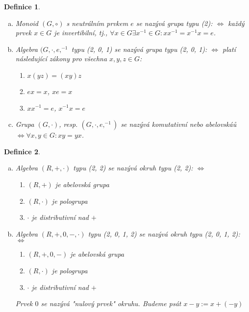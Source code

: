 \documentclass[a4paper, 11pt]{report}
\newtheorem{mydef}{Definice}[chapter]
\begin{document}
\begin{mydef}
\begin{enumerate}[a)]
	\item Monoid $(G, \circ)$ s neutrálním prvkem $e$ se nazývá \emph{grupa} typu (2): $\Leftrightarrow$ každý prvek $x \in G$ je invertibilní, tj., $\forall x \in G \exists x^{-1} \in G: x x^{-1} = x^{-1} x = e$.
	\item Algebra $(G, \cdot, e, ^{-1}$ typu (2, 0, 1) se nazývá \emph{grupa} typu (2, 0, 1): $\Leftrightarrow$ platí následující zákony pro všechna $x, y, z \in G$:
	\begin{enumerate}[1)]
		\item $x(yz) = (xy)z$
		\item $ex = x$, $xe = x$
		\item $x x^{-1} = e$, $x^{-1} x = e$
	\end{enumerate}
	\item Grupa $(G, \cdot)$, resp. $(G, \cdot, e, ^{-1})$ se nazývá \emph{komutativní nebo abelovská}ů $\Leftrightarrow \forall x,y \in G: xy = yx$.
\end{enumerate}
\end{mydef}

\begin{mydef}
\begin{enumerate}[a)]
	\item Algebra $(R, +, \cdot)$ typu (2, 2) se nazývá \emph{okruh} typu (2, 2): $\Leftrightarrow$
	\begin{enumerate}[1)]
		\item $(R, +)$ je abelovská grupa
		\item $(R, \cdot)$ je pologrupa
		\item $\cdot$ je distributivní nad $+$
	\end{enumerate}
	\item Algebra $(R, +, 0, -, \cdot)$ typu (2, 0, 1, 2) se nazývá \emph{okruh} typu (2, 0, 1, 2): $\Leftrightarrow$
		\begin{enumerate}[1)]
		\item $(R, +, 0, -)$ je abelovská grupa
		\item $(R, \cdot)$ je pologrupa
		\item $\cdot$ je distributivní nad $+$
	\end{enumerate}
	Prvek $0$ se nazývá "nulový prvek" okruhu. Budeme psát $x - y:= x + (-y)$
\end{enumerate}
\end{mydef}
\end{document}
